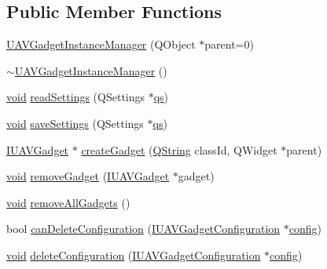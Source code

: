 \subsection*{Public Member Functions}
\begin{DoxyCompactItemize}
\item 
\hyperlink{group___core_plugin_ga44c56bcdae955e258b4c48a4c607ab52}{U\-A\-V\-Gadget\-Instance\-Manager} (Q\-Object $\ast$parent=0)
\item 
\hyperlink{group___core_plugin_gac38f918ffe991bf8a225fc1daad5f7de}{$\sim$\-U\-A\-V\-Gadget\-Instance\-Manager} ()
\item 
\hyperlink{group___u_a_v_objects_plugin_ga444cf2ff3f0ecbe028adce838d373f5c}{void} \hyperlink{group___core_plugin_ga5b0113d08404691baef3c9eb158f00c8}{read\-Settings} (Q\-Settings $\ast$\hyperlink{analyze_i_n_s_g_p_s_8m_a620a138c8981e0536c569d7761df4548}{qs})
\item 
\hyperlink{group___u_a_v_objects_plugin_ga444cf2ff3f0ecbe028adce838d373f5c}{void} \hyperlink{group___core_plugin_ga4256305b1cf5b29402b70613b706139c}{save\-Settings} (Q\-Settings $\ast$\hyperlink{analyze_i_n_s_g_p_s_8m_a620a138c8981e0536c569d7761df4548}{qs})
\item 
\hyperlink{class_core_1_1_i_u_a_v_gadget}{I\-U\-A\-V\-Gadget} $\ast$ \hyperlink{group___core_plugin_gabdaa00bfd5168cb5cea8b951735c4a93}{create\-Gadget} (\hyperlink{group___u_a_v_objects_plugin_gab9d252f49c333c94a72f97ce3105a32d}{Q\-String} class\-Id, Q\-Widget $\ast$parent)
\item 
\hyperlink{group___u_a_v_objects_plugin_ga444cf2ff3f0ecbe028adce838d373f5c}{void} \hyperlink{group___core_plugin_ga204deab3f77d2ebe76925ffd5600e6c7}{remove\-Gadget} (\hyperlink{class_core_1_1_i_u_a_v_gadget}{I\-U\-A\-V\-Gadget} $\ast$gadget)
\item 
\hyperlink{group___u_a_v_objects_plugin_ga444cf2ff3f0ecbe028adce838d373f5c}{void} \hyperlink{group___core_plugin_gab4ee04e79366c92b5a26aa8324876c4a}{remove\-All\-Gadgets} ()
\item 
bool \hyperlink{group___core_plugin_ga9d4a8c428b1550c2a2c831bb0c5f85b6}{can\-Delete\-Configuration} (\hyperlink{class_core_1_1_i_u_a_v_gadget_configuration}{I\-U\-A\-V\-Gadget\-Configuration} $\ast$\hyperlink{deflate_8c_a4473b5227787415097004fd39f55185e}{config})
\item 
\hyperlink{group___u_a_v_objects_plugin_ga444cf2ff3f0ecbe028adce838d373f5c}{void} \hyperlink{group___core_plugin_ga14e36d2e3a2185db7c33574fc3ef71b8}{delete\-Configuration} (\hyperlink{class_core_1_1_i_u_a_v_gadget_configuration}{I\-U\-A\-V\-Gadget\-Configuration} $\ast$\hyperlink{deflate_8c_a4473b5227787415097004fd39f55185e}{config})

\end{DoxyCompactItemize}
